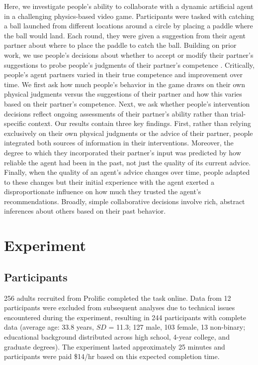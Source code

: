 \documentclass[10pt,letterpaper]{article}
\begin{document}
Here, we investigate people's ability to collaborate with a dynamic artificial agent in a challenging physics-based video game. Participants were tasked with catching a ball launched from different locations around a circle by placing a paddle where the ball would land. Each round, they were given a suggestion from their agent partner about where to place the paddle to catch the ball. Building on prior work, we use people's decisions about whether to accept or modify their partner's suggestions to probe people's judgments of their partner's competence \cite{xie2019robot, chen2020trust}. Critically, people's agent partners varied in their true competence and improvement over time. We first ask how much people's behavior in the game draws on their own physical judgments versus the suggestions of their partner and how this varies based on their partner's competence. Next, we ask whether people's intervention decisions reflect ongoing assessments of their partner's ability rather than trial-specific context. Our results contain three key findings. First, rather than relying exclusively on their own physical judgments or the advice of their partner, people integrated both sources of information in their interventions. Moreover, the degree to which they incorporated their partner's input was predicted by how reliable the agent had been in the past, not just the quality of its current advice. Finally, when the quality of an agent's advice changes over time, people adapted to these changes but their initial experience with the agent exerted a disproportionate influence on how much they trusted the agent's recommendations. Broadly, simple collaborative decisions involve rich, abstract inferences about others based on their past behavior.
 

\section{Experiment}

\subsection{Participants}

256 adults recruited from Prolific completed the task online. Data from 12 participants were excluded from subsequent analyses due to technical issues encountered during the experiment, resulting in 244 participants with complete data (average age: 33.8 years, $SD$ = 11.3; 127 male, 103 female, 13 non-binary; educational background distributed across high school, 4-year college, and graduate degrees). The experiment lasted approximately 25 minutes and participants were paid \$14/hr based on this expected completion time. 
\end{document}
